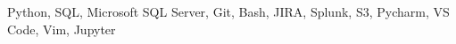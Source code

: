 \begin{experiences}
{\begin{itemize}
                    
                  	\end{itemize}
                    }
                    {Python, SQL, Microsoft SQL Server, Git, Bash, JIRA, Splunk, S3, Pycharm, VS Code, Vim, Jupyter}
                   

\end{experiences}
